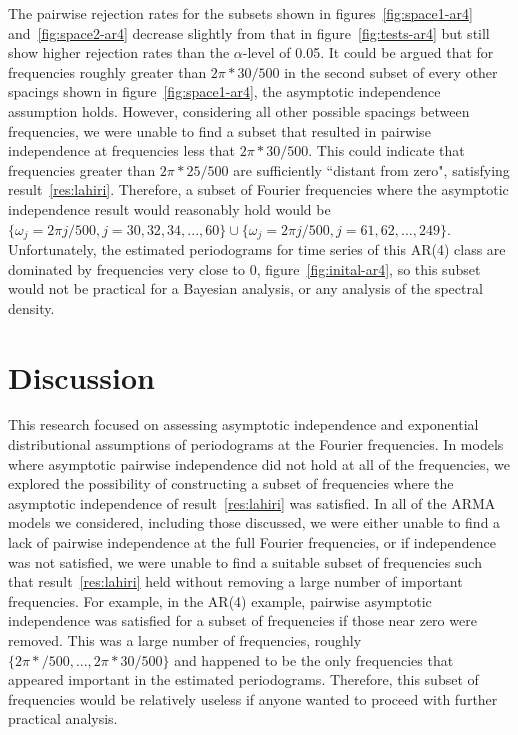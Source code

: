 \documentclass{article}\usepackage[]{graphicx}\usepackage[]{color}
\theoremstyle{plain}
\begin{document}
The pairwise rejection rates for the subsets shown in figures~\ref{fig:space1-ar4} and~\ref{fig:space2-ar4} decrease slightly from that in figure~\ref{fig:tests-ar4} but still show higher rejection rates than the $\alpha$-level of 0.05. It could be argued that for frequencies roughly greater than $2\pi * 30/500$ in the second subset of every other spacings shown in figure~\ref{fig:space1-ar4}, the asymptotic independence assumption holds. However, considering all other possible spacings between frequencies, we were unable to find a subset that resulted in pairwise independence at frequencies less that $2\pi * 30/500$. This could indicate that frequencies greater than $2 \pi * 25/500$ are sufficiently ``distant from zero", satisfying result~\ref{res:lahiri}. Therefore, a subset of Fourier frequencies where the asymptotic independence result would reasonably hold would be $\{\omega_j=2\pi j/500, j=30,32,34,...,60\} \cup \{\omega_j=2\pi j/500, j=61,62,...,249\}$. Unfortunately, the estimated periodograms for time series of this AR(4) class are dominated by frequencies very close to 0, figure~\ref{fig:inital-ar4}, so this subset would not be practical for a Bayesian analysis, or any analysis of the spectral density. 


\section{Discussion}

This research focused on assessing asymptotic independence and exponential distributional assumptions of periodograms at the Fourier frequencies. In models where asymptotic pairwise independence did not hold at all of the frequencies, we explored the possibility of constructing a subset of frequencies where the asymptotic independence of result~\ref{res:lahiri} was satisfied. In all of the ARMA models we considered, including those discussed, we were either unable to find a lack of pairwise independence at the full Fourier frequencies, or if independence was not satisfied, we were unable to find a suitable subset of frequencies such that result~\ref{res:lahiri} held without removing a large number of important frequencies. For example, in the AR(4) example, pairwise asymptotic independence was satisfied for a subset of frequencies if those near zero were removed. This was a large number of frequencies, roughly $\{2\pi */500,...,2\pi* 30/500\}$ and happened to be the only frequencies that appeared important in the estimated periodograms. Therefore, this subset of frequencies would be relatively useless if anyone wanted to proceed with further practical analysis.
\end{document}
